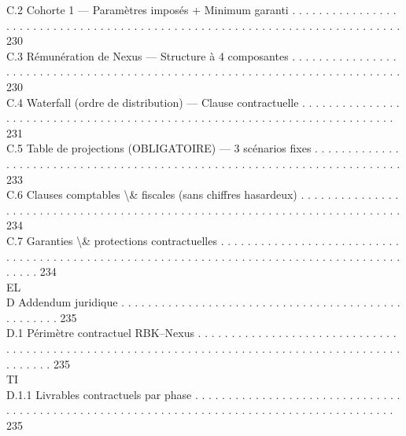 \documentclass[12pt,landscape,a4paper]{article}
\begin{document}
C.2     Cohorte 1 — Paramètres imposés + Minimum garanti . . . . . . . . . . . . . . . . . . . . . . . . . . . . . . . . . . . . . . . . . . . . . . . . . . . . . . . . . . . . . . . . . . . . . . . . . . . 230\\
C.3     Rémunération de Nexus — Structure à 4 composantes . . . . . . . . . . . . . . . . . . . . . . . . . . . . . . . . . . . . . . . . . . . . . . . . . . . . . . . . . . . . . . . . . . . . . . . . . . . 230\\
C.4     Waterfall (ordre de distribution) — Clause contractuelle . . . . . . . . . . . . . . . . . . . . . . . . . . . . . . . . . . . . . . . . . . . . . . . . . . . . . . . . . . . . . . . . . . . . . . . . . 231\\
C.5     Table de projections (OBLIGATOIRE) — 3 scénarios fixes . . . . . . . . . . . . . . . . . . . . . . . . . . . . . . . . . . . . . . . . . . . . . . . . . . . . . . . . . . . . . . . . . . . . . . . . 233\\
C.6     Clauses comptables \textbackslash{}& fiscales (sans chiffres hasardeux) . . . . . . . . . . . . . . . . . . . . . . . . . . . . . . . . . . . . . . . . . . . . . . . . . . . . . . . . . . . . . . . . . . . . . . . . . . 234\\
C.7     Garanties \textbackslash{}& protections contractuelles . . . . . . . . . . . . . . . . . . . . . . . . . . . . . . . . . . . . . . . . . . . . . . . . . . . . . . . . . . . . . . . . . . . . . . . . . . . . . . . . . . . . . . . . . . . 234\\
\vspace{0.5em}
\vspace{0.5em}
\vspace{0.5em}
\vspace{0.5em}
EL\\
D     Addendum juridique . . . . . . . . . . . . . . . . . . . . . . . . . . . . . . . . . . . . . . . . . . . . . . . . . . 235\\
D.1     Périmètre contractuel RBK–Nexus . . . . . . . . . . . . . . . . . . . . . . . . . . . . . . . . . . . . . . . . . . . . . . . . . . . . . . . . . . . . . . . . . . . . . . . . . . . . . . . . . . . . . . . . . . . . . . . . 235\\
\vspace{0.5em}
\vspace{0.5em}
\vspace{0.5em}
\vspace{0.5em}
TI\\
D.1.1               Livrables contractuels par phase . . . . . . . . . . . . . . . . . . . . . . . . . . . . . . . . . . . . . . . . . . . . . . . . . . . . . . . . . . . . . . . . . . . . . . . . . . . . . . . . . . . . . . . . . 235\\
\end{document}
